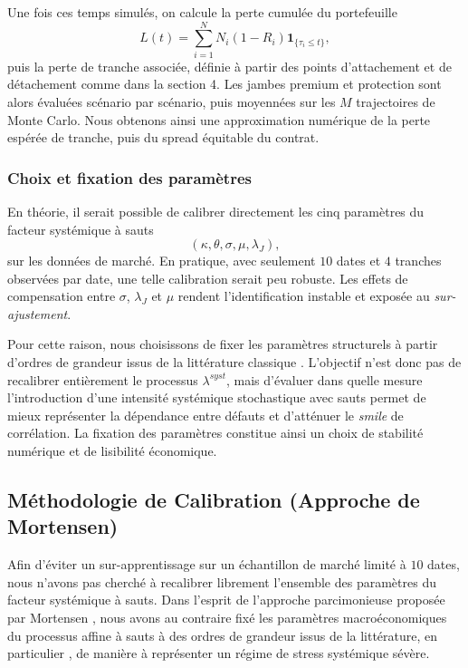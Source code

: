 Une fois ces temps simulés, on calcule la perte cumulée du portefeuille
\begin{equation}
L(t)=\sum_{i=1}^{N} N_i(1-R_i)\mathbf{1}_{\{\tau_i\leq t\}},
\end{equation}
puis la perte de tranche associée, définie à partir des points d'attachement et de détachement comme dans la section 4. Les jambes premium et protection sont alors évaluées scénario par scénario, puis moyennées sur les $M$ trajectoires de Monte Carlo. Nous obtenons ainsi une approximation numérique de la perte espérée de tranche, puis du spread équitable du contrat.

\subsubsection{Choix et fixation des paramètres}

En théorie, il serait possible de calibrer directement les cinq paramètres du facteur systémique à sauts
\begin{equation}
(\kappa,\theta,\sigma,\mu,\lambda_J),
\end{equation}
sur les données de marché. En pratique, avec seulement $10$ dates et $4$ tranches observées par date, une telle calibration serait peu robuste. Les effets de compensation entre $\sigma$, $\lambda_J$ et $\mu$ rendent l'identification instable et exposée au \textit{sur-ajustement}.

Pour cette raison, nous choisissons de fixer les paramètres structurels à partir d'ordres de grandeur issus de la littérature classique \cite{DuffieGarleanu}. L'objectif n'est donc pas de recalibrer entièrement le processus $\lambda^{syst}$, mais d'évaluer dans quelle mesure l'introduction d'une intensité systémique stochastique avec sauts permet de mieux représenter la dépendance entre défauts et d'atténuer le \textit{smile} de corrélation. La fixation des paramètres constitue ainsi un choix de stabilité numérique et de lisibilité économique.

\subsection{Méthodologie de Calibration (Approche de Mortensen)}

Afin d'éviter un sur-apprentissage sur un échantillon de marché limité à $10$ dates, nous n'avons pas cherché à recalibrer librement l'ensemble des paramètres du facteur systémique à sauts. Dans l'esprit de l'approche parcimonieuse proposée par Mortensen \cite{Mortensen2006}, nous avons au contraire fixé les paramètres macroéconomiques du processus affine à sauts à des ordres de grandeur issus de la littérature, en particulier \cite{DuffieGarleanu}, de manière à représenter un régime de stress systémique sévère.

